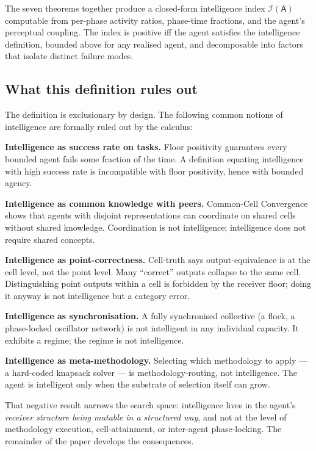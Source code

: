 \documentclass[11pt,twocolumn,a4paper]{article}
\newcommand{\agent}{\mathsf{A}}
\newcommand{\Iindex}{\mathcal{I}}
\begin{document}
The seven theorems together produce a closed-form intelligence index $\Iindex(\agent)$
computable from per-phase activity ratios, phase-time fractions, and the agent's
perceptual coupling. The index is positive iff the agent satisfies the intelligence
definition, bounded above for any realised agent, and decomposable into factors that
isolate distinct failure modes.

\subsection{What this definition rules out}

The definition is exclusionary by design. The following common notions of intelligence
are formally ruled out by the calculus:

\textbf{Intelligence as success rate on tasks.} Floor positivity guarantees every bounded
agent fails some fraction of the time. A definition equating intelligence with high
success rate is incompatible with floor positivity, hence with bounded agency.

\textbf{Intelligence as common knowledge with peers.} Common-Cell Convergence shows that
agents with disjoint representations can coordinate on shared cells without shared
knowledge. Coordination is not intelligence; intelligence does not require shared
concepts.

\textbf{Intelligence as point-correctness.} Cell-truth says output-equivalence is at the
cell level, not the point level. Many ``correct'' outputs collapse to the same cell.
Distinguishing point outputs within a cell is forbidden by the receiver floor; doing it
anyway is not intelligence but a category error.

\textbf{Intelligence as synchronisation.} A fully synchronised collective (a flock, a
phase-locked oscillator network) is not intelligent in any individual capacity. It
exhibits a regime; the regime is not intelligence.

\textbf{Intelligence as meta-methodology.} Selecting which methodology to apply --- a
hard-coded knapsack solver --- is methodology-routing, not intelligence. The agent is
intelligent only when the substrate of selection itself can grow.

That negative result narrows the search space: intelligence lives in the agent's
\emph{receiver structure being mutable in a structured way}, and not at the level of
methodology execution, cell-attainment, or inter-agent phase-locking. The remainder of
the paper develops the consequences.
\end{document}
